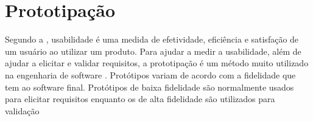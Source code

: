 \section{Prototipação}

Segundo a , usabilidade é uma medida de efetividade, eficiência e satisfação de um usuário ao utilizar um produto. Para ajudar a medir a usabilidade, além de ajudar a elicitar e validar requisitos, a prototipação é um método muito utilizado na engenharia de software \cite{sommervile}.
Protótipos variam de acordo com a fidelidade que tem ao software final. Protótipos de baixa fidelidade são normalmente usados para elicitar requisitos enquanto os de alta fidelidade são utilizados para validação \cite{prototipacao}